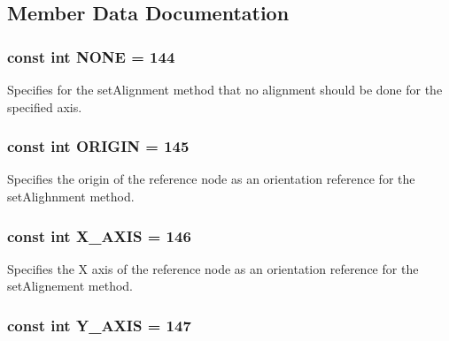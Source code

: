 \subsection{Member Data Documentation}
\hypertarget{classm3g_1_1Node_7b20f1b443e093d5ec5e990e73b47232}{
\subsubsection[{NONE}]{\setlength{\rightskip}{0pt plus 5cm}const int {\bf NONE} = 144}}
\label{classm3g_1_1Node_7b20f1b443e093d5ec5e990e73b47232}


Specifies for the setAlignment method that no alignment should be done for the specified axis. \hypertarget{classm3g_1_1Node_1b0d56eb173868ff472a6fd296c5bb6c}{
\subsubsection[{ORIGIN}]{\setlength{\rightskip}{0pt plus 5cm}const int {\bf ORIGIN} = 145}}
\label{classm3g_1_1Node_1b0d56eb173868ff472a6fd296c5bb6c}


Specifies the origin of the reference node as an orientation reference for the setAlighnment method. \hypertarget{classm3g_1_1Node_dd4bccb7b9c652e726d58b06bd28dab2}{
\subsubsection[{X\_\-AXIS}]{\setlength{\rightskip}{0pt plus 5cm}const int {\bf X\_\-AXIS} = 146}}
\label{classm3g_1_1Node_dd4bccb7b9c652e726d58b06bd28dab2}


Specifies the X axis of the reference node as an orientation reference for the setAlignement method. \hypertarget{classm3g_1_1Node_3248ff73b5411ab0a66a38c451c8b6fe}{
\subsubsection[{Y\_\-AXIS}]{\setlength{\rightskip}{0pt plus 5cm}const int {\bf Y\_\-AXIS} = 147}}
\label{classm3g_1_1Node_3248ff73b5411ab0a66a38c451c8b6fe}


